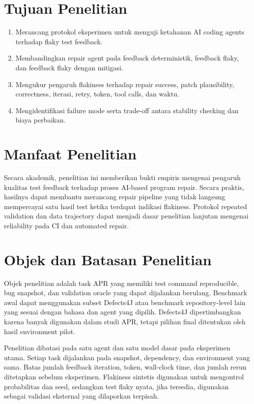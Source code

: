 \section{Tujuan Penelitian}

\begin{enumerate}[leftmargin=*]
    \item Merancang protokol eksperimen untuk menguji ketahanan AI coding agents terhadap flaky test feedback.
    \item Membandingkan repair agent pada feedback deterministik, feedback flaky, dan feedback flaky dengan mitigasi.
    \item Mengukur pengaruh flakiness terhadap repair success, patch plausibility, correctness, iterasi, retry, token, tool calls, dan waktu.
    \item Mengidentifikasi failure mode serta trade-off antara stability checking dan biaya perbaikan.
\end{enumerate}

\section{Manfaat Penelitian}

Secara akademik, penelitian ini memberikan bukti empiris mengenai pengaruh kualitas test feedback terhadap proses AI-based program repair. Secara praktis, hasilnya dapat membantu merancang repair pipeline yang tidak langsung mempercayai satu hasil test ketika terdapat indikasi flakiness. Protokol repeated validation dan data trajectory dapat menjadi dasar penelitian lanjutan mengenai reliability pada CI dan automated repair.

\section{Objek dan Batasan Penelitian}

Objek penelitian adalah task APR yang memiliki test command reproducible, bug snapshot, dan validation oracle yang dapat dijalankan berulang. Benchmark awal dapat menggunakan subset Defects4J atau benchmark repository-level lain yang sesuai dengan bahasa dan agent yang dipilih. Defects4J dipertimbangkan karena banyak digunakan dalam studi APR, tetapi pilihan final ditentukan oleh hasil environment pilot.

Penelitian dibatasi pada satu agent dan satu model dasar pada eksperimen utama. Setiap task dijalankan pada snapshot, dependency, dan environment yang sama. Batas jumlah feedback iteration, token, wall-clock time, dan jumlah rerun ditetapkan sebelum eksperimen. Flakiness sintetis digunakan untuk mengontrol probabilitas dan seed, sedangkan test flaky nyata, jika tersedia, digunakan sebagai validasi eksternal yang dilaporkan terpisah.

